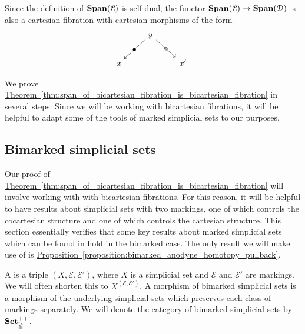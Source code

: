 \documentclass[main.tex]{subfiles}
\begin{document}
\begin{note}
  Since the definition of $\mathbf{Span}(\mathcal{C})$ is self-dual, the functor $\mathbf{Span}(\mathcal{C}) \to \mathbf{Span}(\mathcal{D})$ is also a cartesian fibration with cartesian morphisms of the form
  \begin{equation*}
    \begin{tikzcd}
      & y
      \arrow[dl, "\bullet" marking]
      \arrow[dr, "\circ" marking]
      \\
      x
      && x'
    \end{tikzcd}.
  \end{equation*}
\end{note}

We prove \hyperref[thm:span_of_bicartesian_fibration_is_bicartesian_fibration]{Theorem~\ref*{thm:span_of_bicartesian_fibration_is_bicartesian_fibration}} in several steps. Since we will be working with bicartesian fibrations, it will be helpful to adapt some of the tools of marked simplicial sets to our purposes.

\subsection{Bimarked simplicial sets}
\label{ssc:bimarked_simplicial_sets}

Our proof of \hyperref[thm:span_of_bicartesian_fibration_is_bicartesian_fibration]{Theorem~\ref*{thm:span_of_bicartesian_fibration_is_bicartesian_fibration}} will involve working with with bicartesian fibrations. For this reason, it will be helpful to have results about simplicial sets with two markings, one of which controls the cocartesian structure and one of which controls the cartesian structure. This section essentially verifies that some key results about marked simplicial sets which can be found in \cite[Sec.\ 3.1]{highertopostheory} hold in the bimarked case. The only result we will make use of is \hyperref[proposition:bimarked_anodyne_homotopy_pullback]{Proposition~\ref*{proposition:bimarked_anodyne_homotopy_pullback}}.

\begin{definition}
  A  is a triple $(X, \mathcal{E}, \mathcal{E}')$, where $X$ is a simplicial set and $\mathcal{E}$ and $\mathcal{E}'$ are markings. We will often shorten this to $X^{(\mathcal{E}, \mathcal{E}')}$. A morphism of bimarked simplicial sets is a morphism of the underlying simplicial sets which preserves each class of markings separately. We will denote the category of bimarked simplicial sets by $\mathbf{Set}_{\mathbb{\Delta}}^{++}$.
\end{definition}
\end{document}
